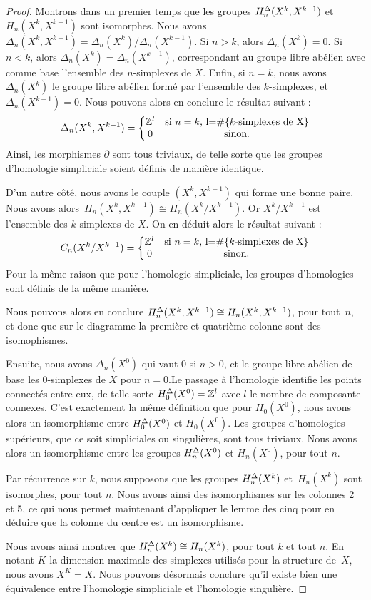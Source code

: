 \begin{proof}
Montrons dans un premier temps que les groupes $H^\Delta_n(X^k,X^{k-1})$ et $H_n(X^k,X^{k-1})$ sont isomorphes. Nous avons $\Delta_n(X^k,X^{k-1})=\Delta_n(X^k)/\Delta_n(X^{k-1})$. Si $n>k$, alors $\Delta_n(X^k)=0$. Si $n<k$, alors $\Delta_n(X^k)=\Delta_n(X^{k-1})$, correspondant au groupe libre abélien avec comme base l'ensemble des $n$-simplexes de $X$. Enfin, si $n=k$, nous avons $\Delta_n(X^k)$ le groupe libre abélien formé par l'ensemble des $k$-simplexes, et $\Delta_n(X^{k-1})=0$. Nous pouvons alors en conclure le résultat suivant : \[\Delta_n(X^k,X^{k-1})= \left\{\begin{matrix}
\mathbb{Z}^l & \text{si $n=k$, l=$\#\{k$-simplexes de X$\}$}\\
0 & \text{sinon}. \\
\end{matrix}\right.\]Ainsi, les morphismes $\partial$ sont tous triviaux, de telle sorte que les groupes d'homologie simpliciale soient définis de manière identique.

D'un autre côté, nous avons le couple $(X^k,X^{k-1})$ qui forme une bonne paire. Nous avons alors~${H_n(X^k,X^{k-1})\cong H_n(X^k/X^{k-1})}$. Or $X^k/X^{k-1}$ est l'ensemble des $k$-simplexes de $X$. On en déduit alors le résultat suivant : \[C_n(X^k/X^{k-1})=\left\{\begin{matrix}
\mathbb{Z}^l & \text{si $n=k$, l=$\#\{k$-simplexes de X$\}$}\\
0&\text{sinon.}
\end{matrix}\right.\]Pour la même raison que pour l'homologie simpliciale, les groupes d'homologies sont définis de la même manière.

Nous pouvons alors en conclure $H^\Delta_n(X^k,X^{k-1})\cong H_n(X^k,X^{k-1})$, pour tout~$n$, et donc que sur le diagramme la première et quatrième colonne sont des isomophismes.

\bigskip Ensuite, nous avons $\Delta_n(X^0)$ qui vaut 0 si $n>0$, et le groupe libre abélien de base les 0-simplexes de $X$ pour $n=0$.Le passage à l'homologie identifie les points connectés entre eux, de telle sorte $H^\Delta_0(X^0)=\mathbb{Z}^l$ avec $l$ le nombre de composante connexes. C'est exactement la même définition que pour $H_0(X^0)$, nous avons alors un isomorphisme entre $H^\Delta_0(X^0)$ et $H_0(X^0)$. Les groupes d'homologies supérieurs, que ce soit simpliciales ou singulières, sont tous triviaux. Nous avons alors un isomorphisme entre les groupes $H^\Delta_n(X^0)$ et $H_n(X^0)$, pour tout $n$.

Par récurrence sur $k$, nous supposons que les groupes $H^\Delta_n(X^k)$ et~$H_n(X^k)$ sont isomorphes, pour tout $n$. Nous avons ainsi des isomorphismes sur les colonnes 2 et 5, ce qui nous permet maintenant d'appliquer le lemme des cinq pour en déduire que la colonne du centre est un isomorphisme.

Nous avons ainsi montrer que $H^\Delta_n(X^k)\cong H_n(X^k)$, pour tout $k$ et tout $n$. En notant $K$ la dimension maximale des simplexes utilisés pour la structure de~$X$, nous avons $X^K=X$. Nous pouvons désormais conclure qu'il existe bien une équivalence entre l'homologie simpliciale et l'homologie singulière.
\end{proof}

